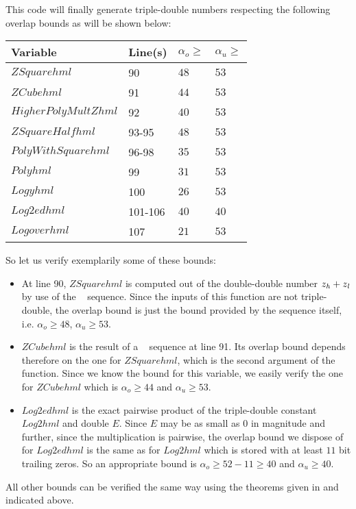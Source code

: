 This code will finally generate triple-double numbers respecting the following overlap bounds as will be
shown below:
\begin{center}
\begin{tabular}{|l|l|l|l|}
\hline
Variable & Line(s) & $\alpha_o \geq$ & $\alpha_u \geq$ \\
\hline
$ZSquarehml$ & 90 & $48$ & $53$ \\
\hline
$ZCubehml$ & 91 & $44$ & $53$ \\
\hline
$HigherPolyMultZhml$ & 92 & $40$ & $53$ \\
\hline 
$ZSquareHalfhml$ & 93-95 & $48$ & $53$ \\
\hline
$PolyWithSquarehml$ & 96-98 & $35$ & $53$ \\
\hline 
$Polyhml$ & 99 & $31$ & $53$ \\
\hline
$Logyhml$ & 100 & $26$ & $53$ \\
\hline
$Log2edhml$ & 101-106 & $40$ & $40$ \\
\hline
$Logoverhml$ & 107 & $21$ & $53$ \\
\hline
\end{tabular}
\end{center}
So let us verify exemplarily some of these bounds: 
\begin{itemize}
\item At line 90, $ZSquarehml$ is computed out of the double-double number $z_{\mathit{h}} + z_{\mathit{l}}$ by use of the \MulDT~ sequence.
Since the inputs of this function are not triple-double, the overlap bound is just the bound provided by the sequence 
itself, i.e. $\alpha_o \geq 48$, $\alpha_u \geq 53$. 
\item $ZCubehml$ is the result of a \MulDTT~ sequence at line 91. Its overlap bound depends therefore on the one
for $ZSquarehml$, which is the second argument of the function. Since we know the bound for this variable, we easily 
verify the one for $ZCubehml$ which is $\alpha_o \geq 44$ and $\alpha_u \geq 53$.
\item $Log2edhml$ is the exact pairwise product of the triple-double constant $Log2hml$ and double $E$. Since $E$ may be
as small as $0$ in magnitude and further, since the multiplication is pairwise, the overlap bound we dispose of for
$Log2edhml$ is the same as for $Log2hml$ which is stored with at least $11$ bit trailing zeros. 
So an appropriate bound is $\alpha_o \geq 52 - 11 \geq 40$ and $\alpha_u \geq 40$. 
\end{itemize}
All other bounds can be verified the same way using the theorems given in \cite{Lau05} and indicated above. \par

